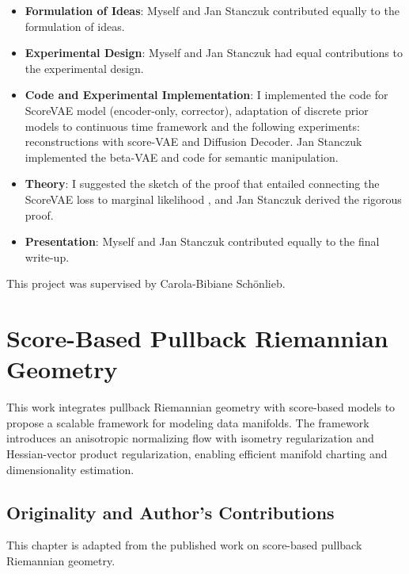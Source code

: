 \begin{itemize}
\item \textbf{Formulation of Ideas}: Myself and Jan Stanczuk contributed equally to the formulation of ideas.
\item \textbf{Experimental Design}: Myself and Jan Stanczuk had equal contributions to the experimental design.
\item \textbf{Code and Experimental Implementation}: I implemented the code for ScoreVAE model (encoder-only, corrector), adaptation of discrete prior models to continuous time framework and the following experiments: reconstructions with score-VAE and Diffusion Decoder. Jan Stanczuk implemented the beta-VAE and code for semantic manipulation.
\item \textbf{Theory}: I suggested the sketch of the proof that entailed connecting the ScoreVAE loss to marginal likelihood \cite{song2021maximum}, and Jan Stanczuk derived the rigorous proof.
\item \textbf{Presentation}: Myself and Jan Stanczuk contributed equally to the final write-up.
\end{itemize}

This project was supervised by Carola-Bibiane Sch\"onlieb.

\section{Score-Based Pullback Riemannian Geometry}

This work integrates pullback Riemannian geometry with score-based models to propose a scalable framework for modeling data manifolds. The framework introduces an anisotropic normalizing flow with isometry regularization and Hessian-vector product regularization, enabling efficient manifold charting and dimensionality estimation.

\subsection*{Originality and Author’s Contributions}

This chapter is adapted from the published work on score-based pullback Riemannian geometry.

